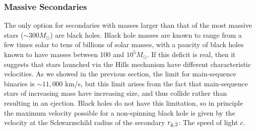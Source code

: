 \documentclass[a4paper,twocolumn]{emulateapj}
\newcommand{\colr}[1]{{\bf \textcolor{red}{[#1]}}}
\begin{document}
%
%

\subsubsection{Massive Secondaries}
The only option for secondaries with masses larger than that of the most massive stars ($\sim 300 M_{\odot}$) are black holes. Black hole masses are known to range from a few times solar to tens of billions of solar masses, with a paucity of black holes known to have masses between 100 and $10^{5} M_{\odot}$. If this deficit is real, then it suggests that stars launched via the Hills mechanism have different characteristic velocities. As we showed in the previous section, the limit for main-sequence binaries is $\sim 11,000$ km/s, but this limit arises from the fact that main-sequence stars of increasing mass have increasing size, and thus collide rather than resulting in an ejection. Black holes do not have this limitation, so in principle the maximum velocity possible for a non-spinning black hole is given by the velocity at the Schwarzschild radius of the secondary $r_{\rm g,2}$: The speed of light $c$.
\end{document}
